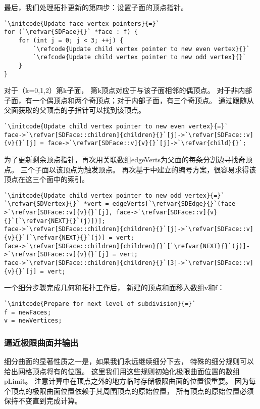 最后，我们处理拓扑更新的第四步：设置子面的顶点指针。
\begin{lstlisting}
`\initcode{Update face vertex pointers}{=}`
for (`\refvar{SDFace}{}` *face : f) {
    for (int j = 0; j < 3; ++j) {
        `\refcode{Update child vertex pointer to new even vertex}{}`
        `\refcode{Update child vertex pointer to new odd vertex}{}`
    }
}
\end{lstlisting}

对于（{\ttfamily k}=0,1,2）第{\ttfamily k}子面，
第{\ttfamily k}顶点对应于与该子面相邻的偶顶点。
对于非内部子面，有一个偶顶点和两个奇顶点；对于内部子面，有三个奇顶点。
通过跟随从父面获取的父顶点的子指针可以找到该顶点。
\begin{lstlisting}
`\initcode{Update child vertex pointer to new even vertex}{=}`
face->`\refvar[SDFace::children]{children}{}`[j]->`\refvar[SDFace::v]{v}{}`[j] = face->`\refvar[SDFace::v]{v}{}`[j]->`\refvar{child}{}`;
\end{lstlisting}

为了更新剩余顶点指针，再次用关联数组{\ttfamily edgeVerts}为父面的每条分割边寻找奇顶点。
三个子面以该顶点为触发顶点。
再次基于中建立的编号方案，很容易求得该顶点在这三个面中的索引。
\begin{lstlisting}
`\initcode{Update child vertex pointer to new odd vertex}{=}`
`\refvar{SDVertex}{}` *vert = edgeVerts[`\refvar{SDEdge}{}`(face->`\refvar[SDFace::v]{v}{}`[j], face->`\refvar[SDFace::v]{v}{}`[`\refvar{NEXT}{}`(j)])];
face->`\refvar[SDFace::children]{children}{}`[j]->`\refvar[SDFace::v]{v}{}`[`\refvar{NEXT}{}`(j)] = vert;
face->`\refvar[SDFace::children]{children}{}`[`\refvar{NEXT}{}`(j)]->`\refvar[SDFace::v]{v}{}`[j] = vert;
face->`\refvar[SDFace::children]{children}{}`[3]->`\refvar[SDFace::v]{v}{}`[j] = vert;
\end{lstlisting}

一个细分步骤完成几何和拓扑工作后，
新建的顶点和面移入数组{\ttfamily v}和{\ttfamily f}：
\begin{lstlisting}
`\initcode{Prepare for next level of subdivision}{=}`
f = newFaces;
v = newVertices;
\end{lstlisting}

\subsubsection*{逼近极限曲面并输出}
细分曲面的显著性质之一是，如果我们永远继续细分下去，
特殊的细分规则可以给出网格顶点将有的位置。
这里我们用这些规则初始化极限曲面位置的数组{\ttfamily pLimit}。
注意计算中在顶点之外的地方临时存储极限曲面的位置很重要。
因为每个顶点的极限曲面位置依赖于其周围顶点的原始位置，
所有顶点的原始位置必须保持不变直到完成计算。

